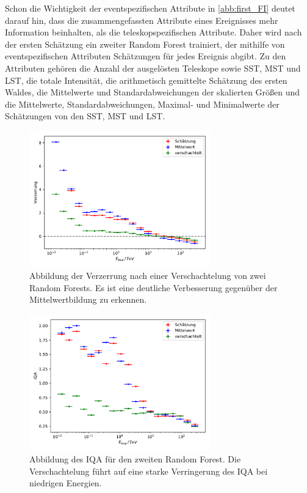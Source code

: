 Schon die Wichtigkeit der eventspezifischen Attribute in \autoref{abb:first_FI} deutet darauf hin, dass die zusammengefassten Attribute eines Ereignisses
mehr Information beinhalten, als die teleskopspezifischen Attribute.
Daher wird nach der ersten Schätzung ein zweiter Random Forest trainiert, der mithilfe von eventspezifischen Attributen Schätzungen für jedes Ereignis abgibt.
Zu den Attributen gehören die Anzahl der ausgelösten Teleskope sowie SST, MST und LST, die totale Intensität, die arithmetisch gemittelte Schätzung des
ersten Waldes, die Mittelwerte und Standardabweichungen der skalierten Größen und die Mittelwerte, Standardabweichungen, Maximal- und Minimalwerte der
Schätzungen von den SST, MST und LST.
\begin{figure}
  \includegraphics[width=0.7\textwidth]{Plots/RF_nested_bias.pdf}
  \centering
  \caption{Abbildung der Verzerrung nach einer Verschachtelung von zwei Random Forests. Es ist eine deutliche Verbesserung gegenüber der Mittelwertbildung
            zu erkennen.}
  \label{abb:nest_bias}
\end{figure}
\begin{figure}
  \includegraphics[width=0.7\textwidth]{Plots/RF_nested_resolution.pdf}
  \centering
  \caption{Abbildung des IQA für den zweiten Random Forest. Die Verschachtelung führt auf eine starke Verringerung des IQA bei niedrigen Energien.}
  \label{abb:nest_IQA}
\end{figure}

